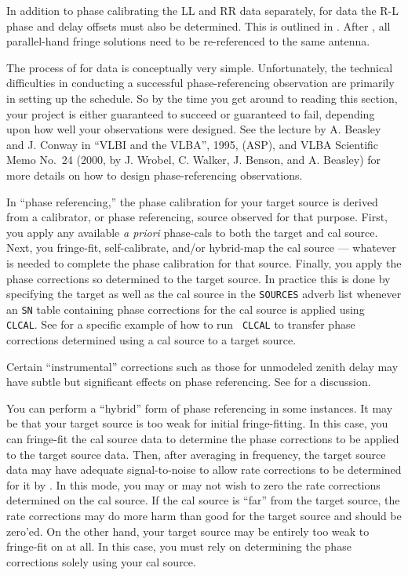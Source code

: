 
In addition to phase calibrating the LL and RR data separately, for
 data the R-L phase and delay offsets must also be
determined.  This is outlined in \@.  After
, all parallel-hand fringe solutions need to be
re-referenced to the same antenna.


The process of  for  data is
conceptually very simple.  Unfortunately, the technical difficulties
in conducting a successful phase-referencing observation are primarily
in setting up the schedule.  So by the time you get around to reading
this section, your project is either guaranteed to succeed or
guaranteed to fail, depending upon how well your observations were
designed.  See the lecture by A. Beasley and J. Conway in ``VLBI and
the VLBA'', 1995, (ASP), and VLBA Scientific Memo No.~24 (2000, by J.
Wrobel, C. Walker, J. Benson, and A. Beasley) for more details on how
to design phase-referencing observations.

In ``phase referencing,'' the phase calibration for your target source
is derived from a calibrator, or phase referencing, source observed
for that purpose.  First, you apply any available {\it a priori\/}
phase-cals to both the target and cal source.  Next, you fringe-fit,
self-calibrate, and/or hybrid-map the cal source --- whatever is
needed to complete the phase calibration for that source. Finally, you
apply the phase corrections so determined to the target source.  In
practice this is done by specifying the target as well as the cal
source in the {\tt SOURCES} adverb list whenever an {\tt SN} table
containing phase corrections for the cal source is applied using {\tt
CLCAL}\@.  See  for a specific example of how to run {\tt
CLCAL} to transfer phase corrections determined using a cal source to
a target source.

Certain ``instrumental'' corrections such as those for unmodeled
zenith delay may have subtle but significant effects on phase
referencing.  See  for a discussion.

You can perform a ``hybrid'' form of phase referencing in some
instances.  It may be that your target source is too weak for initial
fringe-fitting.  In this case, you can fringe-fit the cal source data
to determine the phase corrections to be applied to the target source
data.  Then, after averaging in frequency, the target source data may
have adequate signal-to-noise to allow rate corrections to be
determined for it by .  In this mode, you may or
may not wish to zero the rate corrections determined on the cal
source.  If the cal source is ``far'' from the target source, the rate
corrections may do more harm than good for the target source and
should be zero'ed.  On the other hand, your target source may be
entirely too weak to fringe-fit on at all.  In this case, you must
rely on determining the phase corrections solely using your cal
source.

